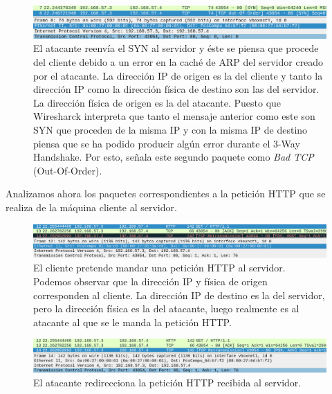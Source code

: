 \documentclass[11pt]{article}
\begin{document}
\begin{figure}[H]
	\centering
	\includegraphics[width=160mm]{images/atack1/syn-atacker-server}
	\caption{El atacante reenvía el SYN al servidor y éste se piensa que procede del cliente debido a un error en la caché de ARP del servidor
		creado por el atacante. La dirección IP de origen es la del cliente y tanto la dirección IP como la dirección física de destino son las del servidor. La dirección física de origen es la del atacante. Puesto que Wiresharck interpreta que tanto el mensaje anterior como este son SYN que proceden de la misma IP y con la misma IP de destino piensa que se ha podido producir algún error durante el 3-Way Handshake. Por esto, señala este segundo paquete como \textit{Bad TCP} (Out-Of-Order).}
	\label{fig:syn-atacker-server}
\end{figure}

Analizamos ahora los paquetes correspondientes a la petición HTTP que se realiza de la máquina cliente al servidor. 

\begin{figure}[H]
	\centering
	\includegraphics[width=160mm]{images/atack1/request-client-atacker}
	\caption{El cliente pretende mandar una petición HTTP al servidor. Podemos observar que la dirección IP y física de origen corresponden al cliente. La dirección IP de destino es la del servidor, pero la dirección física es la del atacante, luego realmente es al atacante al que se le manda la petición HTTP.}
	\label{fig:request-client-atacker}
\end{figure}

\begin{figure}[H]
	\centering
	\includegraphics[width=160mm]{images/atack1/request-atacker-server}
	\caption{El atacante redirecciona la petición HTTP recibida al servidor. }
	\label{fig:request-atacker-server}
\end{figure}
\end{document}
